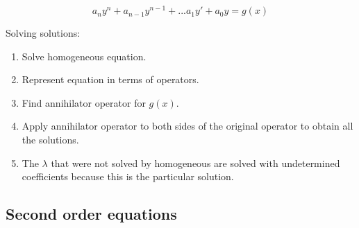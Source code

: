 \documentclass[letterpaper]{article}
\newcommand{\divline}{\noindent\makebox[\linewidth]{\rule{\textwidth}{0.4pt}}}
\begin{document}
    \begin{multicols}{2}

        \[a_{n}y^{n} + a_{n-1}y^{n-1} + ... a_{1}y' + a_{0}y = g(x)\]
        
        Solving solutions:
        \begin{enumerate}
            \item Solve homogeneous equation.
            \item Represent equation in terms of operators.
            \item Find annihilator operator for \(g(x)\).
            \item Apply annihilator operator to both sides of the original operator to obtain all the solutions.
            \item The \(\lambda\) that were not solved by homogeneous are solved with undetermined coefficients because this is the particular solution.
        \end{enumerate}
    \end{multicols}

    \divline
    
    \begin{multicols}{2}
        \section{Second order equations}
        
    
    \end{multicols}  
    \divline
\end{document}
